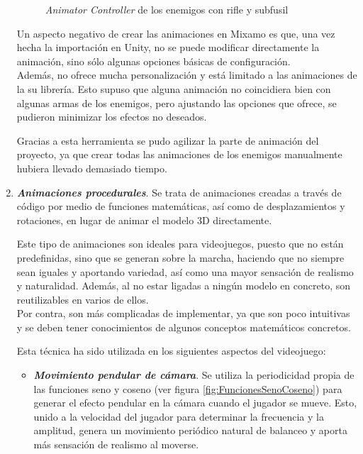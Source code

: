 \begin{enumerate}
\begin{figure}[h]
	\caption{\textit{Animator Controller} de los enemigos con rifle y subfusil}
	\label{fig:AnimatorController}
    \end{figure}
    Un aspecto negativo de crear las animaciones en Mixamo es que, una vez hecha la importación en Unity, no se puede modificar directamente la animación, sino sólo algunas opciones básicas de configuración.\\ Además, no ofrece mucha personalización y está limitado a las animaciones de la su librería. Esto supuso que alguna animación no coincidiera bien con algunas armas de los enemigos, pero ajustando las opciones que ofrece, se pudieron minimizar los efectos no deseados.
    
    Gracias a esta herramienta se pudo agilizar la parte de animación del proyecto, ya que crear todas las animaciones de los enemigos manualmente hubiera llevado demasiado tiempo.
    \item \textbf{\textit{Animaciones procedurales}}. Se trata de animaciones creadas a través de código por medio de funciones matemáticas, así como de desplazamientos y rotaciones, en lugar de animar el modelo 3D directamente.
    
    Este tipo de animaciones son ideales para videojuegos, puesto que no están predefinidas, sino que se generan sobre la marcha, haciendo que no siempre sean iguales y aportando variedad, así como una mayor sensación de realismo y naturalidad. Además, al no estar ligadas a ningún modelo en concreto, son reutilizables en varios de ellos.\\
    Por contra, son más complicadas de implementar, ya que son poco intuitivas y se deben tener conocimientos de algunos conceptos matemáticos concretos.
    
    Esta técnica ha sido utilizada en los siguientes aspectos del videojuego:
    \begin{itemize}
    \tightlist
	\item \textbf{\textit{Movimiento pendular de cámara}}. Se utiliza la periodicidad propia de las funciones seno y coseno (ver figura \ref{fig:FuncionesSenoCoseno}) para generar el efecto pendular en la cámara cuando el jugador se mueve. Esto, unido a la velocidad del jugador para determinar la frecuencia y la amplitud, genera un movimiento periódico natural de balanceo y aporta más sensación de realismo al moverse.
	

\end{itemize}
\end{enumerate}
